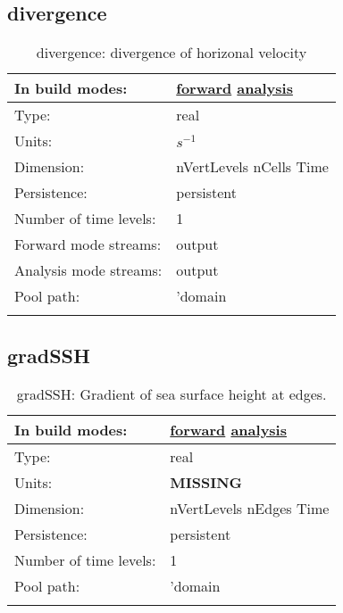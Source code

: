\subsection[divergence]{divergence}
\label{subsec:var_sec_diagnostics_divergence}
\begin{center}
\begin{longtable}{| p{2.0in} | p{4.0in} |}
        \hline 
        In build modes: & \hyperref[subsec:forward_var_tab_diagnostics]{forward} \hyperref[subsec:analysis_var_tab_diagnostics]{analysis} \\
        \hline 
        Type: & real \\
        \hline 
        Units: & $s^{-1}$ \\
        \hline 
        Dimension: & nVertLevels nCells Time \\
        \hline 
        Persistence: & persistent \\
        \hline 
        Number of time levels: & 1 \\
        \hline 
		 Forward mode streams: &  output \\
        \hline 
		 Analysis mode streams: &  output \\
        \hline 
            Pool path: & 'domain %
 \\
		 \hline 
    \caption{divergence: divergence of horizonal velocity}
\end{longtable}
\end{center}
\subsection[gradSSH]{gradSSH}
\label{subsec:var_sec_diagnostics_gradSSH}
\begin{center}
\begin{longtable}{| p{2.0in} | p{4.0in} |}
        \hline 
        In build modes: & \hyperref[subsec:forward_var_tab_diagnostics]{forward} \hyperref[subsec:analysis_var_tab_diagnostics]{analysis} \\
        \hline 
        Type: & real \\
        \hline 
        Units: & {\bf \color{red} MISSING} \\
        \hline 
        Dimension: & nVertLevels nEdges Time \\
        \hline 
        Persistence: & persistent \\
        \hline 
        Number of time levels: & 1 \\
        \hline 
            Pool path: & 'domain %
 \\
		 \hline 
    \caption{gradSSH: Gradient of sea surface height at edges.}
\end{longtable}
\end{center}

